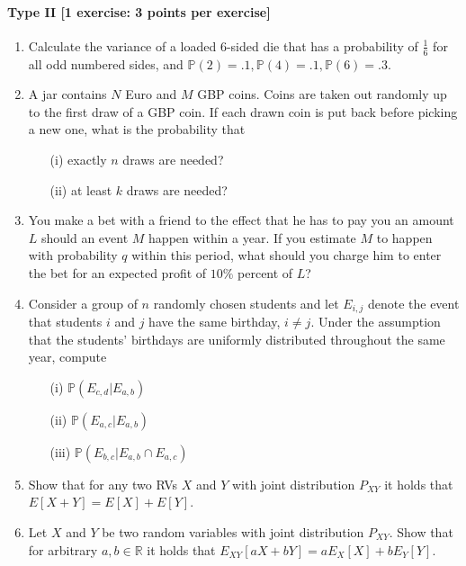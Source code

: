 \documentclass{article}
\begin{document}
\paragraph{Type II [1 exercise: 3 points per exercise]}
\begin{enumerate}
\item Calculate the variance of a loaded 6-sided die that has a probability of $\frac{1}{6}$ for all odd numbered sides, and $\mathbb{P}(2) = .1,  \mathbb{P}(4) = .1, \mathbb{P}(6) = .3$.
	\item A jar contains $N$ Euro and $M$ GBP coins. Coins are taken out randomly up to the first draw of a GBP coin. If each drawn coin is put back before picking a new one, what is the probability that
		\begin{itemize}
			\item[(i)] exactly $n$ draws are needed?
			\item[(ii)] at least $k$ draws are needed?
		\end{itemize}
	\item You make a bet with a friend to the effect that he has to pay you an amount $L$ should an event $M$ happen within a year. If you estimate $M$ to happen with probability $q$ within this period, what should you charge him to enter the bet for an expected profit of $10\%$ percent of $L$?
	\item Consider a group of $n$ randomly chosen students and let $E_{i,j}$ denote the event that students $i$ and $j$ have the same birthday, $i \neq j$. Under the assumption that the students' birthdays are uniformly distributed throughout the same year, compute
		\begin{itemize}
			\item[(i)] $\mathbb{P}(E_{c,d}|E_{a,b})$
			\item[(ii)] $\mathbb{P}(E_{a,c}|E_{a,b})$
			\item[(iii)] $\mathbb{P}(E_{b,c}|E_{a,b} \cap E_{a,c})$
		\end{itemize}
	\item Show that for any two RVs $ X $ and $ Y $ with joint distribution $ P_{XY} $ it holds that $ E[X+Y] = E[X] + E[Y] $.
\item Let $X$ and $Y$ be two random variables with joint distribution $P_{XY}$. Show that for arbitrary $a,b \in \mathbb{R}$ it holds that $E_{XY}[aX + bY] = a E_X[X] + b E_Y[Y].$

	\end{enumerate}
\end{document}
